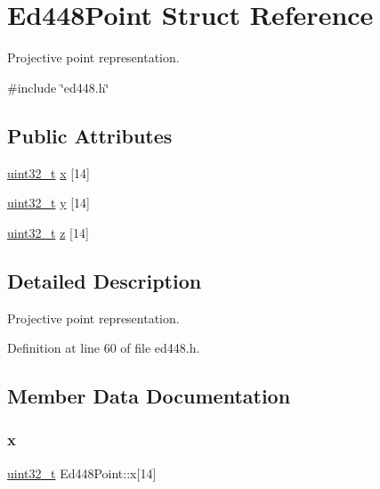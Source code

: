 \hypertarget{structEd448Point}{}\section{Ed448\+Point Struct Reference}
\label{structEd448Point}


Projective point representation.  




{\ttfamily \#include \char`\"{}ed448.\+h\char`\"{}}

\subsection*{Public Attributes}
\begin{DoxyCompactItemize}
\item 
\hyperlink{stdint_8h_a435d1572bf3f880d55459d9805097f62}{uint32\+\_\+t} \hyperlink{structEd448Point_a6396f5c659c12687df267e45d6c12069}{x} \mbox{[}14\mbox{]}
\item 
\hyperlink{stdint_8h_a435d1572bf3f880d55459d9805097f62}{uint32\+\_\+t} \hyperlink{structEd448Point_a21298d9fefc8531fa8b77062e9e97591}{y} \mbox{[}14\mbox{]}
\item 
\hyperlink{stdint_8h_a435d1572bf3f880d55459d9805097f62}{uint32\+\_\+t} \hyperlink{structEd448Point_a17b31287fc682b3d42e6dc5685aaf237}{z} \mbox{[}14\mbox{]}
\end{DoxyCompactItemize}


\subsection{Detailed Description}
Projective point representation. 

Definition at line 60 of file ed448.\+h.



\subsection{Member Data Documentation}
\mbox{\label{structEd448Point_a6396f5c659c12687df267e45d6c12069}} 
\subsubsection{\texorpdfstring{x}{x}}
{\footnotesize\ttfamily \hyperlink{stdint_8h_a435d1572bf3f880d55459d9805097f62}{uint32\+\_\+t} Ed448\+Point\+::x\mbox{[}14\mbox{]}}



